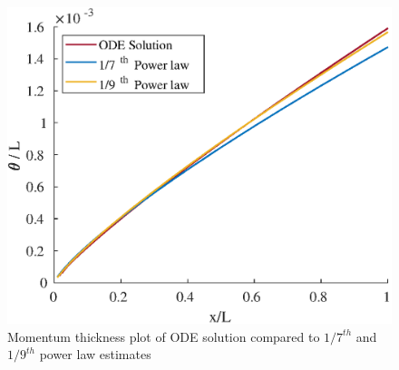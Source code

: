 



\begin{figure}[H]
\centering
\includegraphics[scale=0.8]{graphs/e4g1.eps}
\caption{Momentum thickness plot of ODE solution compared to $1/7^{th}$ and $1/9^{th}$ power law estimates}
\label{e4g1}
\end{figure}

\pagebreak